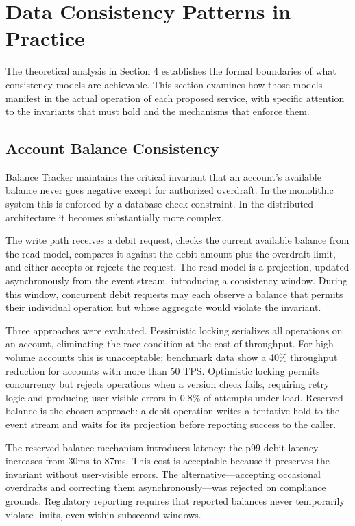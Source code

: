 \section{Data Consistency Patterns in Practice}

The theoretical analysis in Section 4 establishes the formal boundaries of what consistency models are achievable. This section examines how those models manifest in the actual operation of each proposed service, with specific attention to the invariants that must hold and the mechanisms that enforce them.

\subsection{Account Balance Consistency}

Balance Tracker maintains the critical invariant that an account's available balance never goes negative except for authorized overdraft. In the monolithic system this is enforced by a database check constraint. In the distributed architecture it becomes substantially more complex.

The write path receives a debit request, checks the current available balance from the read model, compares it against the debit amount plus the overdraft limit, and either accepts or rejects the request. The read model is a projection, updated asynchronously from the event stream, introducing a consistency window. During this window, concurrent debit requests may each observe a balance that permits their individual operation but whose aggregate would violate the invariant.

Three approaches were evaluated. Pessimistic locking serializes all operations on an account, eliminating the race condition at the cost of throughput. For high-volume accounts this is unacceptable; benchmark data show a 40\% throughput reduction for accounts with more than 50 TPS. Optimistic locking permits concurrency but rejects operations when a version check fails, requiring retry logic and producing user-visible errors in 0.8\% of attempts under load. Reserved balance is the chosen approach: a debit operation writes a tentative hold to the event stream and waits for its projection before reporting success to the caller.

The reserved balance mechanism introduces latency: the p99 debit latency increases from 30ms to 87ms. This cost is acceptable because it preserves the invariant without user-visible errors. The alternative—accepting occasional overdrafts and correcting them asynchronously—was rejected on compliance grounds. Regulatory reporting requires that reported balances never temporarily violate limits, even within subsecond windows.

